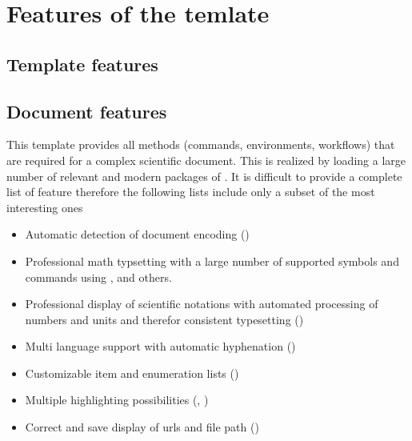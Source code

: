 \section{Features of the temlate}
\label{sec:doc:features}

\subsection{Template features}

\subsection{Document features}
This template provides all methods (commands, environments, workflows) that are required for a complex scientific document. This is realized by 
loading a large number of relevant and modern packages of \latex. It is difficult to provide a complete list of feature therefore the following lists include only a subset of the most interesting ones

\begin{itemize}
\item Automatic detection of document encoding ()
\end{itemize}

\begin{itemize}
\item Professional math typsetting with a large number of supported symbols and commands using ,  and others.
%
\item Professional display of scientific notations with automated processing of numbers and units and therefor consistent typesetting ()
%
\end{itemize}

\begin{itemize}
\item Multi language support with automatic hyphenation ()
%
\item Customizable item and enumeration lists ()
%
\item Multiple highlighting possibilities (, )
%
\item Correct and save display of urls and file path ()
\end{itemize}


